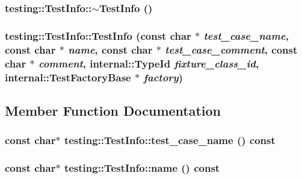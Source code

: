 \subsubsection{\setlength{\rightskip}{0pt plus 5cm}testing::TestInfo::$\sim$TestInfo ()}\label{classtesting_1_1TestInfo_5a6046a6bc1990cd3d34b777d1ea2efb}


\subsubsection{\setlength{\rightskip}{0pt plus 5cm}testing::TestInfo::TestInfo (const char $\ast$ {\em test\_\-case\_\-name}, const char $\ast$ {\em name}, const char $\ast$ {\em test\_\-case\_\-comment}, const char $\ast$ {\em comment}, {\bf internal::TypeId} {\em fixture\_\-class\_\-id}, {\bf internal::TestFactoryBase} $\ast$ {\em factory})\hspace{0.3cm}{\tt  [package]}}\label{classtesting_1_1TestInfo_0c48a55b93a44fbdc86311e095d03443}




\subsection{Member Function Documentation}
\subsubsection{\setlength{\rightskip}{0pt plus 5cm}const char$\ast$ testing::TestInfo::test\_\-case\_\-name () const}\label{classtesting_1_1TestInfo_ce66c230c07aadcacb59fe050b10048c}


\subsubsection{\setlength{\rightskip}{0pt plus 5cm}const char$\ast$ {\bf testing::TestInfo::name} () const}\label{classtesting_1_1TestInfo_98187c43314e8e23cc6ccdccb5465d50}


